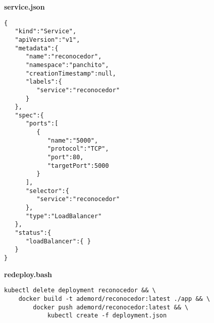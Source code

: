 {\sffamily \textbf{service.json}}
\begin{mdframed}[linecolor=black, topline=true, bottomline=true,
  leftline=false, rightline=false, backgroundcolor=LightGray,userdefinedwidth=\textwidth]
\begin{verbatim}
{  
   "kind":"Service",
   "apiVersion":"v1",
   "metadata":{  
      "name":"reconocedor",
      "namespace":"panchito",
      "creationTimestamp":null,
      "labels":{  
         "service":"reconocedor"
      }
   },
   "spec":{  
      "ports":[  
         {  
            "name":"5000",
            "protocol":"TCP",
            "port":80,
            "targetPort":5000
         }
      ],
      "selector":{  
         "service":"reconocedor"
      },
      "type":"LoadBalancer"
   },
   "status":{  
      "loadBalancer":{ }
   }
}
\end{verbatim}
\end{mdframed}

{\sffamily \textbf{redeploy.bash}}
\begin{mdframed}[linecolor=black, topline=true, bottomline=true,
  leftline=false, rightline=false, backgroundcolor=LightGray,userdefinedwidth=\textwidth]
\begin{verbatim}
kubectl delete deployment reconocedor && \
    docker build -t ademord/reconocedor:latest ./app && \
        docker push ademord/reconocedor:latest && \
            kubectl create -f deployment.json

\end{verbatim}
\end{mdframed}

